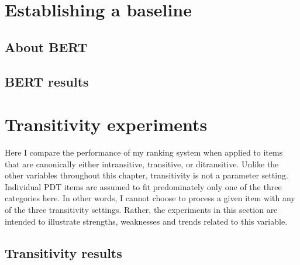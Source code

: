 \section{Establishing a baseline}
\label{sec:bert-baseline}
\subsection{About BERT}
\label{sec:about-bert}
\subsection{BERT results}
\label{sec:bert-results}

\section{Transitivity experiments}
\label{sec:exp-transitivity}
Here I compare the performance of my ranking system when applied to items that are canonically either intransitive, transitive, or ditransitive. Unlike the other variables throughout this chapter, transitivity is not a parameter setting. Individual PDT items are assumed to fit predominately only one of the three categories here. In other words, I cannot choose to process a given item with any of the three transitivity settings. Rather, the experiments in this section are intended to illustrate strengths, weaknesses and trends related to this variable.

\subsection{Transitivity results}
\label{sec:transitivity-results}


